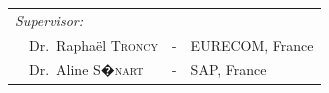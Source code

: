 {\begin{titlepage}



\begin{center}
\noindent \large
\begin{tabular}{llcl}


\\
  \textit{Supervisor:}&     & & \\
  \multicolumn{2}{l}{~~Dr.\ Rapha\"el \textsc{Troncy}} & - & EURECOM, France \\
  \multicolumn{2}{l}{~~Dr.\ Aline \textsc{S�nart}}     & - & SAP, France \\
\end{tabular}
\end{center}

\end{titlepage}

}
